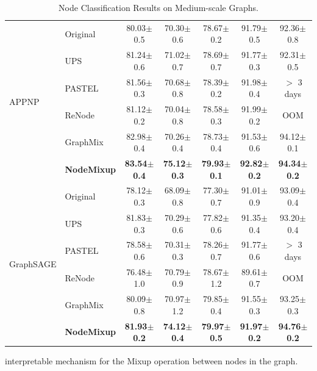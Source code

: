 \documentclass[letterpaper]{article} %
\begin{document}
\begin{table}[!htbp]
\begin{tabular}{l l c c c c c}
    \multirow{6}{*}{APPNP} & Original & 80.03\small{$\pm$0.5} & 70.30\small{$\pm$0.6} & 78.67\small{$\pm$0.2} & 91.79\small{$\pm$0.5} & 92.36\small{$\pm$0.8}\\
    ~ & UPS & 81.24\small{$\pm$0.6} & 71.02\small{$\pm$0.7} & 78.69\small{$\pm$0.7} & 91.77\small{$\pm$0.3} & 92.31\small{$\pm$0.5} \\
    ~ & PASTEL & 81.56\small{$\pm$0.3} & 70.68\small{$\pm$0.8} & 78.39\small{$\pm$0.2} & 91.98\small{$\pm$0.4} & $>$ 3 days\\
    ~ & ReNode & 81.12\small{$\pm$0.2} & 70.04\small{$\pm$0.8} & 78.58\small{$\pm$0.3} &	91.99\small{$\pm$0.2} & OOM \\
    ~ & GraphMix & 82.98\small{$\pm$0.4} & 70.26\small{$\pm$0.4} & 78.73\small{$\pm$0.4} & 91.53\small{$\pm$0.6} & 94.12\small{$\pm$0.1} \\
    ~ & \textbf{NodeMixup} &  \textbf{83.54\small{$\pm$0.4}}  & \textbf{75.12\small{$\pm$0.3}}  & \textbf{79.93\small{$\pm$0.1}} &  \textbf{92.82\small{$\pm$0.2}}  & \textbf{94.34\small{$\pm$0.2}}\\
    \midrule
    \multirow{6}{*}{GraphSAGE} & Original & 78.12\small{$\pm$0.3} & 68.09\small{$\pm$0.8} & 77.30\small{$\pm$0.7} & 91.01\small{$\pm$0.9} & 93.09\small{$\pm$0.4}\\
    ~ & UPS & 81.83\small{$\pm$0.3} & 70.29\small{$\pm$0.6} & 77.82\small{$\pm$0.6} & 91.35\small{$\pm$0.4} & 93.20\small{$\pm$0.4} \\
    ~ & PASTEL & 78.58\small{$\pm$0.6} & 70.31\small{$\pm$0.3} & 78.26\small{$\pm$0.7} & 91.77\small{$\pm$0.6} & $>$ 3 days\\
    ~ & ReNode & 76.48\small{$\pm$1.0} & 70.79\small{$\pm$0.9} & 78.67\small{$\pm$1.2} &	89.61\small{$\pm$0.7} & OOM \\
    ~ & GraphMix & 80.09\small{$\pm$0.8} & 70.97\small{$\pm$1.2} & 79.85\small{$\pm$0.4} & 91.55\small{$\pm$0.3} & 93.25\small{$\pm$0.3} \\
    ~ & \textbf{NodeMixup} & \textbf{81.93\small{$\pm$0.2}} &  \textbf{74.12\small{$\pm$0.4}}  & \textbf{79.97\small{$\pm$0.5}}  & \textbf{91.97\small{$\pm$0.2}} & \textbf{94.76\small{$\pm$0.2}}\\
    \bottomrule
    \hline
    \end{tabular}
    \caption{Node Classification Results on Medium-scale Graphs.}
    \label{tab:results_public}
\end{table}
interpretable mechanism for the Mixup operation between nodes in the graph.
\end{document}
